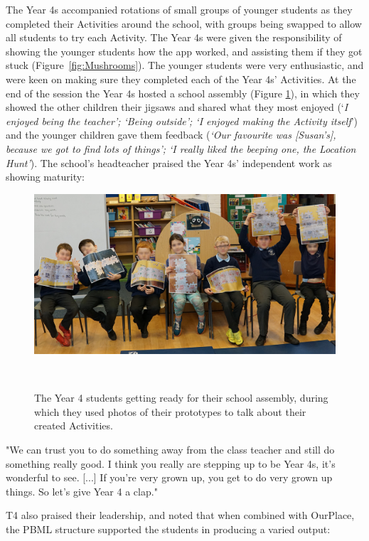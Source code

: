 The Year 4s accompanied rotations of small groups of younger students as they completed their Activities around the school, with groups being swapped to allow all students to try each Activity. The Year 4s were given the responsibility of showing the younger students how the app worked, and assisting them if they got stuck (Figure~\ref{fig:Mushrooms}). The younger students were very enthusiastic, and were keen on making sure they completed each of the Year 4s' Activities. At the end of the session the Year 4s hosted a school assembly (Figure \ref{fig:Assembly}), in which they showed the other children their jigsaws and shared what they most enjoyed (`\textit{I enjoyed being the teacher'; `Being outside'; `I enjoyed making the Activity itself}') and the younger children gave them feedback (\textit{`Our favourite was [Susan's], because we got to find lots of things'; `I really liked the beeping one, the Location Hunt'}). The school's headteacher praised the Year 4s' independent work as showing maturity: 

\begin{figure}
\centering
  \includegraphics[width=0.8\columnwidth]{images/chapter08/assembly.jpg}
  \caption[Year 4 students hosting a school assembly to talk about their Activities]{The Year 4 students getting ready for their school assembly, during which they used photos of their prototypes to talk about their created Activities.}~\label{fig:Assembly}
\end{figure}

\begin{displayquote}
"We can trust you to do something away from the class teacher and still do something really good. I think you really are stepping up to be Year 4s, it's wonderful to see. [...] If you're very grown up, you get to do very grown up things. So let's give Year 4 a clap."
\end{displayquote}

T4 also praised their leadership, and noted that when combined with OurPlace, the PBML structure supported the students in producing a varied output:

